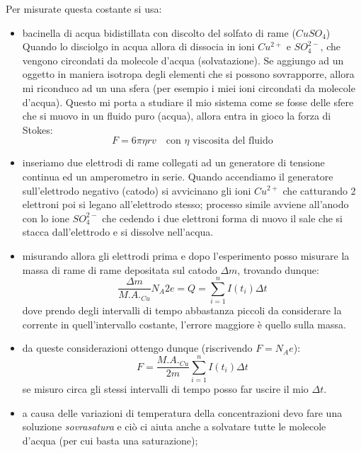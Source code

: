 \documentclass{article}
\begin{document}
Per misurate questa costante si usa:
\begin{itemize}
    \item bacinella di acqua bidistillata con discolto del solfato di rame ($CuSO_4$) \\
    Quando lo disciolgo in acqua allora di dissocia in ioni $Cu^{2+}$ e $SO_4^{2-}$, che vengono circondati da molecole d'acqua (solvatazione).
    Se aggiungo ad un oggetto in maniera isotropa degli elementi che si possono sovrapporre, allora mi riconduco ad un una sfera (per esempio i miei ioni circondati da molecole d'acqua). 
    Questo mi porta a studiare il mio sistema come se fosse delle sfere che si muovo in un fluido puro (acqua), allora entra in gioco la forza di Stokes: 
    \[
    F= 6 \pi \eta r v \quad \text{con $\eta$ viscosita del fluido} 
    \]

    \item inseriamo due elettrodi di rame collegati ad un generatore di tensione continua ed un amperometro in serie. 
    Quando accendiamo il generatore sull'elettrodo negativo (catodo) si avvicinano gli ioni $Cu^{2+}$ che catturando 2 elettroni poi si legano all'elettrodo stesso; processo simile avviene all'anodo con lo ione $SO_4^{2-}$ che cedendo i due elettroni forma di nuovo il sale che si stacca dall'elettrodo 
    e si dissolve nell'acqua. 
    \item misurando allora gli elettrodi prima e dopo l'esperimento posso misurare la massa di rame di rame depositata sul catodo $\Delta m$, trovando dunque:
    \[
    \frac{\Delta m}{M.A._{Cu}} N_A 2 e = Q = \sum_{i=1}^{n} I(t_i) \Delta t 
    \]
    dove prendo degli intervalli di tempo abbastanza piccoli da considerare la corrente in quell'intervallo costante, l'errore maggiore è quello sulla massa. 
    \item da queste considerazioni ottengo dunque (riscrivendo  $F=N_A e$):
    \[F= \frac{M.A._{Cu}}{2 m} \sum_{i=1}^{n} I(t_i) \Delta t \]
    se misuro circa gli stessi intervalli di tempo posso far uscire il mio $\Delta t$. 
    \item a causa delle variazioni di temperatura della concentrazioni devo fare una soluzione \textit{sovrasatura} e ciò ci aiuta anche a solvatare tutte le molecole d'acqua (per cui basta una saturazione);
\end{itemize}
\end{document}
